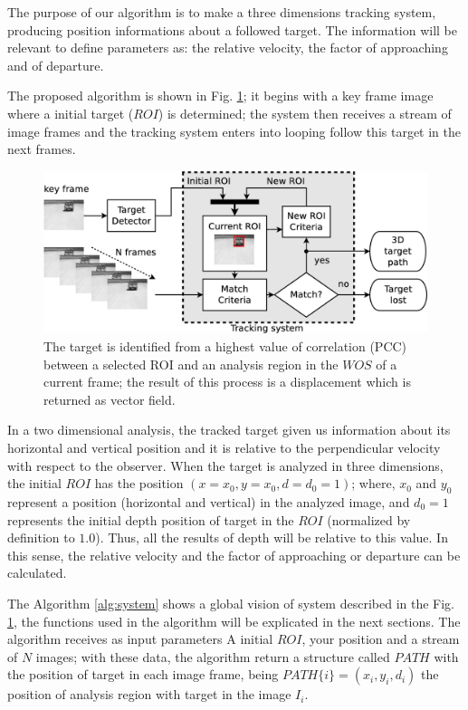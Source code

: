 The purpose of our algorithm is to make a three dimensions tracking system, producing position informations 
about a followed target.
The information will be relevant to define parameters 
as: the relative velocity, the factor of approaching and of departure.

The proposed algorithm is shown in Fig. \ref{fig:system};
it begins with a key frame image where a initial target ($ROI$) is determined; 
the system then receives a stream of image frames and the tracking system 
enters into looping follow this target in the next frames.

\begin{figure}[h]
\includegraphics[width=\columnwidth]{images/figure1-diagram1.eps}
\caption{The target is identified from a highest value of correlation (PCC) between a selected ROI and an analysis region in
the $WOS$ of a current frame; the result of this process is a displacement which is  returned as vector field.}
\label{fig:system}
\end{figure}


In a two dimensional analysis, the tracked target given us information about its horizontal 
and vertical position and it is relative to the perpendicular velocity with respect to the observer.
When the target is analyzed in three dimensions, 
the initial $ROI$ has the position $(x=x_0,y=x_0,d=d_0=1)$;
where, $x_0$ and $y_0$ represent a position (horizontal and vertical) in the analyzed image,
and $d_0=1$ represents the initial depth position of target in the $ROI$ (normalized by definition to $1.0$).
Thus, all the results of depth will be relative to this value. In this sense, the relative velocity and 
the factor of approaching or departure can be calculated.

The Algorithm \ref{alg:system} shows a global vision of system described in the 
Fig. \ref{fig:system}, the functions used in the algorithm
will be explicated in the next sections. The algorithm receives as input parameters
A initial $ROI$, your position and a stream of $N$ images; with these data, the
algorithm return a structure called $PATH$ with the position of target in each image frame,
being $PATH\{i\}=(x_i,y_i,d_i)$ the position of analysis region with target in the image $I_i$.

